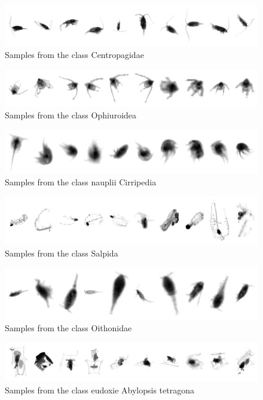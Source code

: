 \begin{figure}[h]
\includegraphics[width=\columnwidth]{collage/071_Centropagidae.jpg}\caption{Samples from the class Centropagidae }
\end{figure}
\begin{figure}[h]
\includegraphics[width=\columnwidth]{collage/072_Ophiuroidea.jpg}\caption{Samples from the class Ophiuroidea }
\end{figure}
\begin{figure}[h]
\includegraphics[width=\columnwidth]{collage/073_nauplii__Cirripedia.jpg}\caption{Samples from the class nauplii  Cirripedia }
\end{figure}
\begin{figure}[h]
\includegraphics[width=\columnwidth]{collage/074_Salpida.jpg}\caption{Samples from the class Salpida }
\end{figure}
\begin{figure}[h]
\includegraphics[width=\columnwidth]{collage/075_Oithonidae.jpg}\caption{Samples from the class Oithonidae }
\end{figure}
\begin{figure}[h]
\includegraphics[width=\columnwidth]{collage/076_eudoxie__Abylopsis_tetragona.jpg}\caption{Samples from the class eudoxie  Abylopsis tetragona }
\end{figure}
